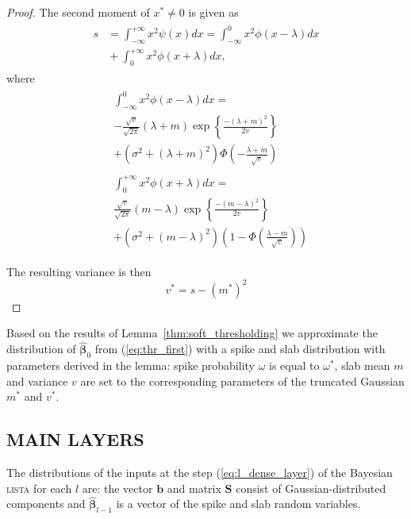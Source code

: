\documentclass[letterpaper]{article}
\begin{document}
\begin{proof}
The second moment of $x^* \neq 0$ is given as
\begin{align}
\label{eq:thr_second_moment}
\begin{split}
s &= \int_{-\infty}^{+\infty}x^2\psi(x)dx = \int_{-\infty}^{0}x^2\phi(x-\lambda)dx \\
&{}+ \int_{0}^{+\infty}x^2\phi(x+\lambda)dx,
\end{split}
\end{align}
where
\begin{align}
\begin{split}
&\int_{-\infty}^{0}x^2\phi(x-\lambda)dx = \\
&-\frac{\sqrt{v}}{\sqrt{2\pi}} (\lambda+m)\exp\left\{\frac{-(\lambda+m)^2}{2v}\right\}\\
& + (\sigma^2 + (\lambda+m)^2)\Phi\left(-\frac{\lambda+m}{\sqrt{v}}\right)
\end{split}\\
\begin{split}
&\int_{0}^{+\infty}x^2\phi(x+\lambda)dx = \\
&\frac{\sqrt{v}}{\sqrt{2\pi}} (m - \lambda)\exp\left\{\frac{-(m - \lambda)^2}{2v}\right\}\\
& + (\sigma^2 + (m - \lambda)^2)\left(1 - \Phi\left(\frac{\lambda -m}{\sqrt{v}}\right)\right)
\end{split}
\end{align}

The resulting variance is then
\begin{equation}
v^* = s- (m^*)^2
\end{equation}
\end{proof}

Based on the results of Lemma~\ref{thm:soft_thresholding} we approximate the distribution of $\widehat{\boldsymbol\beta}_0$ from (\ref{eq:thr_first}) with a spike and slab distribution with parameters derived in the lemma: spike probability $\omega$ is equal to $\omega^*$, slab mean $m$ and variance $v$ are set to the corresponding parameters of the truncated Gaussian $m^*$ and $v^*$.

\subsection{\uppercase{Main layers}}
The distributions of the inputs at the step (\ref{eq:l_dense_layer}) of the Bayesian \textsc{lista} for each $l$ are: the vector $\mathbf{b}$ and matrix $\mathbf{S}$ consist of Gaussian-distributed components and $\widehat{\boldsymbol\beta}_{l-1}$ is a vector of the spike and slab random variables.
\end{document}
